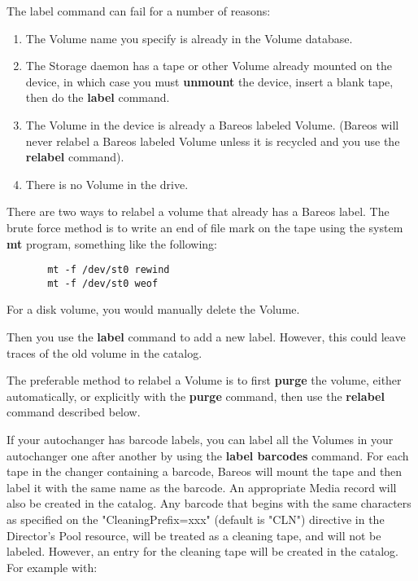 \begin{description}
The label command can fail for a number of reasons:

\begin{enumerate}
\item The Volume name you specify is already in the  Volume database.

\item The Storage daemon has a tape or other Volume already mounted on the
   device, in which case you must {\bf unmount} the device, insert a blank
   tape, then do the {\bf label} command.

\item The Volume in the device is already a Bareos labeled Volume.  (Bareos will
   never relabel a Bareos labeled Volume unless it is recycled and you use the
   {\bf relabel} command).

\item There is no Volume in the drive.
\end{enumerate}

There are two ways to relabel a volume that already has a Bareos label. The
brute  force method is to write an end of file mark on the tape  using the
system {\bf mt} program, something like the  following:

\footnotesize
\begin{verbatim}
       mt -f /dev/st0 rewind
       mt -f /dev/st0 weof
\end{verbatim}
\normalsize

For a disk volume, you would manually delete the Volume.

Then you use the {\bf label} command to add a new label.  However, this could
leave traces of the old volume in the  catalog.

The preferable method to relabel a Volume is to first {\bf purge}  the volume,
either automatically, or explicitly with the  {\bf purge} command, then use
the {\bf relabel} command described  below.

If your autochanger has barcode labels, you can label all the Volumes in
your autochanger one after another by using the {\bf label barcodes}
command.  For each tape in the changer containing a barcode, Bareos will
mount the tape and then label it with the same name as the barcode.  An
appropriate Media record will also be created in the catalog.  Any barcode
that begins with the same characters as specified on the
"CleaningPrefix=xxx" (default is "CLN") directive in the Director's Pool resource, will be
treated as a cleaning tape, and will not be labeled.  However, an entry for
the cleaning tape will be created in the catalog.  For example with:


\end{description}
